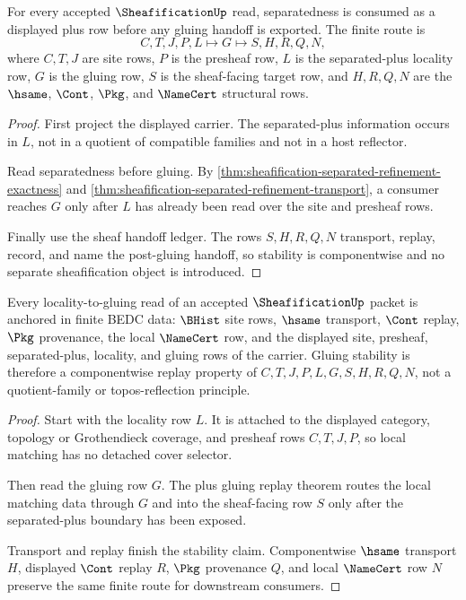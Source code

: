 \begin{theorem}
\label{thm:sheafification-plus-separation-obligation}
For every accepted $\SheafificationUp$ read, separatedness is consumed as a displayed plus row before any gluing handoff is exported. The finite route is
$$
C,T,J,P,L \longmapsto G \longmapsto S,H,R,Q,N ,
$$
where $C,T,J$ are site rows, $P$ is the presheaf row, $L$ is the separated-plus locality row, $G$ is the gluing row, $S$ is the sheaf-facing target row, and $H,R,Q,N$ are the $\hsame$, $\Cont$, $\Pkg$, and $\NameCert$ structural rows.
\end{theorem}
\begin{proof}
First project the displayed carrier. The separated-plus information occurs in $L$, not in a quotient of compatible families and not in a host reflector.

Read separatedness before gluing. By \autoref{thm:sheafification-separated-refinement-exactness} and \autoref{thm:sheafification-separated-refinement-transport}, a consumer reaches $G$ only after $L$ has already been read over the site and presheaf rows.

Finally use the sheaf handoff ledger. The rows $S,H,R,Q,N$ transport, replay, record, and name the post-gluing handoff, so stability is componentwise and no separate sheafification object is introduced.
\end{proof}

\begin{theorem}
\label{thm:sheafification-locality-gluing-obligation}
Every locality-to-gluing read of an accepted $\SheafificationUp$ packet is anchored in finite BEDC data: $\BHist$ site rows, $\hsame$ transport, $\Cont$ replay, $\Pkg$ provenance, the local $\NameCert$ row, and the displayed site, presheaf, separated-plus, locality, and gluing rows of the carrier. Gluing stability is therefore a componentwise replay property of $C,T,J,P,L,G,S,H,R,Q,N$, not a quotient-family or topos-reflection principle.
\end{theorem}
\begin{proof}
Start with the locality row $L$. It is attached to the displayed category, topology or Grothendieck coverage, and presheaf rows $C,T,J,P$, so local matching has no detached cover selector.

Then read the gluing row $G$. The plus gluing replay theorem routes the local matching data through $G$ and into the sheaf-facing row $S$ only after the separated-plus boundary has been exposed.

Transport and replay finish the stability claim. Componentwise $\hsame$ transport $H$, displayed $\Cont$ replay $R$, $\Pkg$ provenance $Q$, and local $\NameCert$ row $N$ preserve the same finite route for downstream consumers.
\end{proof}

